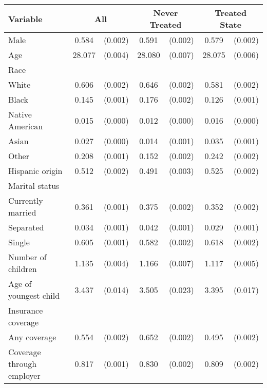 \begin{tabular}{lcccccc}
\toprule
\toprule
 Variable & \multicolumn{2}{c}{All} & \multicolumn{2}{c}{Never Treated} & \multicolumn{2}{c}{Treated State} \\
\midrule 
 Male   & 0.584 & (0.002)  & 0.591 & (0.002)  & 0.579 & (0.002)  \\
 Age   & 28.077 & (0.004)  & 28.080 & (0.007)  & 28.075 & (0.006)  \\
 Race   & & &  \\
 \hspace{0.3cm}  White   & 0.606 & (0.002)  & 0.646 & (0.002)  & 0.581 & (0.002)  \\
 \hspace{0.3cm}  Black   & 0.145 & (0.001)  & 0.176 & (0.002)  & 0.126 & (0.001)  \\
 \hspace{0.3cm}  Native American   & 0.015 & (0.000)  & 0.012 & (0.000)  & 0.016 & (0.000)  \\
 \hspace{0.3cm}  Asian   & 0.027 & (0.000)  & 0.014 & (0.001)  & 0.035 & (0.001)  \\
 \hspace{0.3cm}  Other   & 0.208 & (0.001)  & 0.152 & (0.002)  & 0.242 & (0.002)  \\
 Hispanic origin   & 0.512 & (0.002)  & 0.491 & (0.003)  & 0.525 & (0.002)  \\
 Marital status   & & &  \\
 \hspace{0.3cm} Currently married   & 0.361 & (0.001)  & 0.375 & (0.002)  & 0.352 & (0.002)  \\
 \hspace{0.3cm} Separated   & 0.034 & (0.001)  & 0.042 & (0.001)  & 0.029 & (0.001)  \\
 \hspace{0.3cm} Single   & 0.605 & (0.001)  & 0.582 & (0.002)  & 0.618 & (0.002)  \\
 Number of children   & 1.135 & (0.004)  & 1.166 & (0.007)  & 1.117 & (0.005)  \\
 Age of youngest child   & 3.437 & (0.014)  & 3.505 & (0.023)  & 3.395 & (0.017)  \\
 Insurance coverage   & & &  \\
 \hspace{0.3cm}  Any coverage   & 0.554 & (0.002)  & 0.652 & (0.002)  & 0.495 & (0.002)  \\
 \hspace{0.3cm}  Coverage through employer   & 0.817 & (0.001)  & 0.830 & (0.002)  & 0.809 & (0.002)  \\

\end{tabular}
